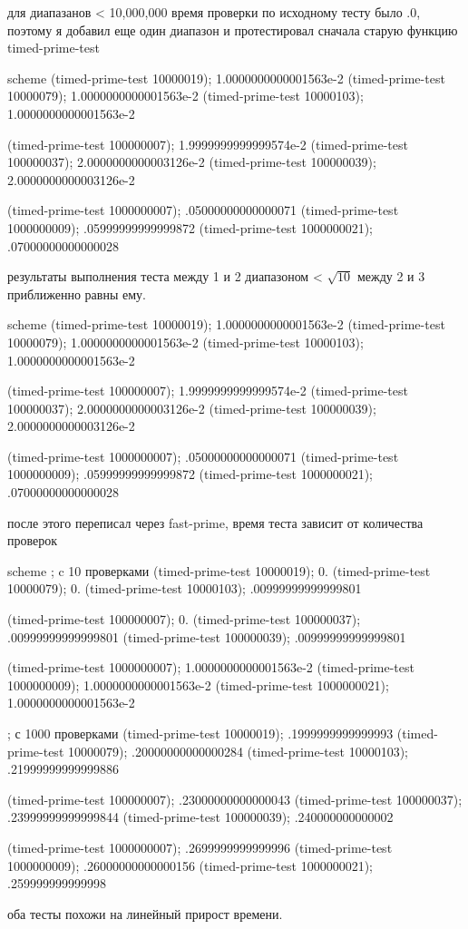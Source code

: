 для диапазанов < 10,000,000 время проверки по исходному тесту было .0, поэтому я добавил еще один диапазон и протестировал сначала старую функцию timed-prime-test

\begin{codelisting}{scheme}
(timed-prime-test 10000019); 1.0000000000001563e-2
(timed-prime-test 10000079); 1.0000000000001563e-2
(timed-prime-test 10000103); 1.0000000000001563e-2

(timed-prime-test 100000007); 1.9999999999999574e-2
(timed-prime-test 100000037); 2.0000000000003126e-2
(timed-prime-test 100000039); 2.0000000000003126e-2

(timed-prime-test 1000000007); .05000000000000071
(timed-prime-test 1000000009); .05999999999999872
(timed-prime-test 1000000021); .07000000000000028
\end{codelisting}

результаты выполнения теста между 1 и 2 диапазоном < $\sqrt{10}$ между 2 и 3 приближенно равны ему.

\begin{codelisting}{scheme}
(timed-prime-test 10000019); 1.0000000000001563e-2
(timed-prime-test 10000079); 1.0000000000001563e-2
(timed-prime-test 10000103); 1.0000000000001563e-2

(timed-prime-test 100000007); 1.9999999999999574e-2
(timed-prime-test 100000037); 2.0000000000003126e-2
(timed-prime-test 100000039); 2.0000000000003126e-2

(timed-prime-test 1000000007); .05000000000000071
(timed-prime-test 1000000009); .05999999999999872
(timed-prime-test 1000000021); .07000000000000028
\end{codelisting}

после этого переписал через fast-prime, время теста зависит от количества проверок

\begin{codelisting}{scheme}
; c 10 проверками
(timed-prime-test 10000019); 0.
(timed-prime-test 10000079); 0.
(timed-prime-test 10000103); .00999999999999801

(timed-prime-test 100000007); 0.
(timed-prime-test 100000037); .00999999999999801
(timed-prime-test 100000039); .00999999999999801

(timed-prime-test 1000000007); 1.0000000000001563e-2
(timed-prime-test 1000000009); 1.0000000000001563e-2
(timed-prime-test 1000000021); 1.0000000000001563e-2

; с 1000 проверками
(timed-prime-test 10000019); .1999999999999993
(timed-prime-test 10000079); .20000000000000284
(timed-prime-test 10000103); .21999999999999886

(timed-prime-test 100000007); .23000000000000043
(timed-prime-test 100000037); .23999999999999844
(timed-prime-test 100000039); .240000000000002

(timed-prime-test 1000000007); .2699999999999996
(timed-prime-test 1000000009); .26000000000000156
(timed-prime-test 1000000021); .259999999999998
\end{codelisting}

оба тесты похожи на линейный прирост времени.